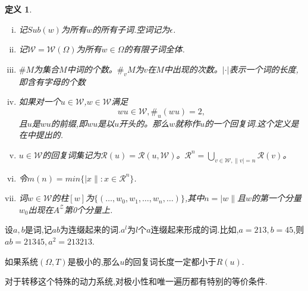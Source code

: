 \documentclass[a4paper,11pt,oneside]{book}
\newtheorem{definition}{\textbf{\hspace{0.7cm}定义}}[section]
\begin{document}
\begin{definition}
\begin{enumerate}[(i)]
\item 记$Sub(w)$为所有$w$的所有子词.空词记为$\epsilon$.
\item 记$\mathcal{W}=\mathcal{W}(\Omega)$为所有$w\in \Omega$的有限子词全体.
\item $\#M$为集合$M$中词的个数。$\#_vM$为$v$在$M$中出现的次数。$|\cdot|$表示一个词的长度,即含有字母的个数
\item 如果对一个$u\in \mathcal{W}$,$w\in \mathcal{W}$满足%
$$w u\in \mathcal{W},\#_u(w u)=2,$$
且$u$是$wu$的前缀,即$wu$是以$u$开头的。那么$w$就称作$u$的一个回复词.这个定义是在\cite{d}中提出的.
\item $u\in \mathcal{W}$的回复词集记为$\mathcal{R}(u)=\mathcal{R}(u,\mathcal{W})$。$\mathcal{R}^n=\bigcup_{v\in \mathcal{W},\|v|=n}\mathcal{R}(v)$。
\item 令$m(n)=min\{|x\|:x\in \mathcal{R}^n\}$.
\item 词$w\in \mathcal{W}$的柱$[w]$为$\{(\ldots,w_0,w_1,\ldots,w_n,\ldots)\}$,其中$n=|w\|$且$w$的第一个分量$w_0$出现在$A^{\mathcal{Z}}$第0个分量上.
\end{enumerate}

\end{definition}

设$a,b$是词,记$ab$为连缀起来的词.$a^l$为$l$个$a$连缀起来形成的词.比如,$a=213,b=45$,则$ab=21345,a^2=213213$.

如果系统$(\Omega,T)$是极小的,那么$u$的回复词长度一定都小于$R(u)$.

对于转移这个特殊的动力系统,对极小性和唯一遍历都有特别的等价条件.
\end{document}
